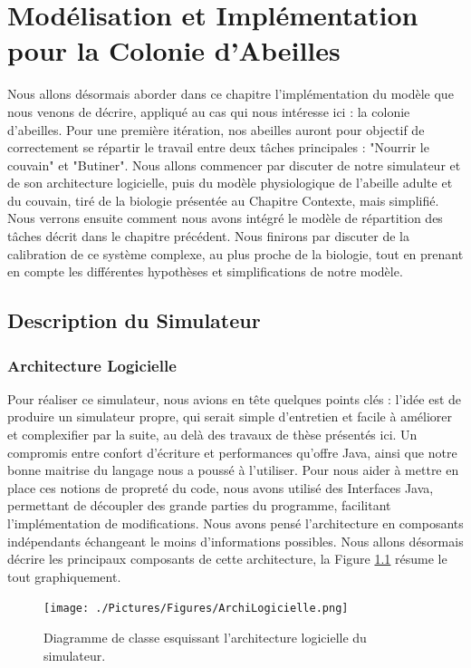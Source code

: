 \chapter{Modélisation et Implémentation pour la Colonie d'Abeilles}

	Nous allons désormais aborder dans ce chapitre l'implémentation du modèle que nous venons de décrire, appliqué au cas qui nous intéresse ici : la colonie d'abeilles. Pour une première itération, nos abeilles auront pour objectif de correctement se répartir le travail entre deux tâches principales : "Nourrir le couvain" et "Butiner". Nous allons commencer par discuter de notre simulateur et de son architecture logicielle, puis du modèle physiologique de l'abeille adulte et du couvain, tiré de la biologie présentée au Chapitre Contexte, mais simplifié. Nous verrons ensuite comment nous avons intégré le modèle de répartition des tâches décrit dans le chapitre précédent. Nous finirons par discuter de la calibration de ce système complexe, au plus proche de la biologie, tout en prenant en compte les différentes hypothèses et simplifications de notre modèle.
	
	\section{Description du Simulateur}
		\subsection{Architecture Logicielle}
			Pour réaliser ce simulateur, nous avions en tête quelques points clés : l'idée est de produire un simulateur propre, qui serait simple d'entretien et facile à améliorer et complexifier par la suite, au delà des travaux de thèse présentés ici. Un compromis entre confort d'écriture et performances qu'offre Java, ainsi que notre bonne maitrise du langage nous a poussé à l'utiliser. Pour nous aider à mettre en place ces notions de propreté du code, nous avons utilisé des Interfaces Java, permettant de découpler des grande parties du programme, facilitant l'implémentation de modifications. Nous avons pensé l'architecture en composants indépendants échangeant le moins d'informations possibles. Nous allons désormais décrire les principaux composants de cette architecture, la Figure \ref{ArchiLogicielle} résume le tout graphiquement.
			
			\begin{figure}
			\centering
			\texttt{[image: ./Pictures/Figures/ArchiLogicielle.png]}
			\caption{Diagramme de classe esquissant l'architecture logicielle du simulateur.}
			\label{ArchiLogicielle}
			\end{figure}
			
